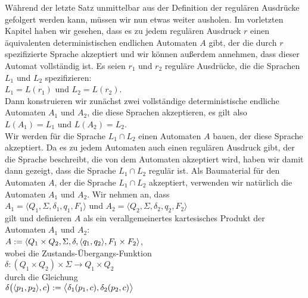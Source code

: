 \proof W\"ahrend der letzte Satz unmittelbar aus der Definition der regul\"aren Ausdr\"ucke
gefolgert werden kann, m\"ussen wir nun etwas weiter ausholen.  Im vorletzten Kapitel haben wir
gesehen, dass es zu jedem regul\"aren Ausdruck $r$ einen \"aquivalenten deterministischen
endlichen Automaten $A$ gibt, der die durch $r$ spezifizierte Sprache akzeptiert und wir
k\"onnen au{\ss}erdem annehmen, dass dieser Automat vollst\"andig ist.  Es seien $r_1$ und $r_2$
regul\"are Ausdr\"ucke, die die Sprachen $L_1$ und $L_2$ spezifizieren:
\\[0.2cm]
\hspace*{1.3cm}
$L_1 = L(r_1)$ \quad und \quad $L_2 = L(r_2)$.
\\[0.2cm]
Dann konstruieren wir zun\"achst zwei vollst\"andige deterministische endliche Automaten $A_1$
und $A_2$, die diese Sprachen akzeptieren, es gilt also
\\[0.2cm]
\hspace*{1.3cm}
$L(A_1) = L_1$ \quad und \quad $L(A_2) = L_2$.
\\[0.2cm]
Wir werden f\"ur die Sprache $L_1 \cap L_2$ einen Automaten $A$ bauen, der diese Sprache
akzeptiert.  Da es zu jedem Automaten auch einen regul\"aren Ausdruck gibt, 
der die Sprache beschreibt, die von dem Automaten akzeptiert wird, 
haben wir damit dann gezeigt, dass die Sprache $L_1 \cap L_2$ regul\"ar ist.
Als Baumaterial f\"ur den Automaten $A$, der die Sprache $L_1 \cap L_2$ akzeptiert, 
verwenden wir nat\"urlich die Automaten $A_1$ und $A_2$.  Wir nehmen an, dass
\\[0.2cm]
\hspace*{1.3cm}
$A_1 = \langle Q_1, \Sigma, \delta_1, q_1, F_1 \rangle$ \quad und \quad
$A_2 = \langle Q_2, \Sigma, \delta_2, q_2, F_2 \rangle$
\\[0.2cm]
gilt und definieren $A$ als ein verallgemeinertes kartesisches Produkt der Automaten $A_1$ und $A_2$:
\\[0.2cm]
\hspace*{1.3cm}
$A := \langle Q_1 \times Q_2, \Sigma, \delta, \pair(q_1,q_2), F_1 \times F_2 \rangle$,
\\[0.2cm]
wobei die Zustands-\"Ubergangs-Funktion 
\\[0.2cm]
\hspace*{1.3cm}
 $\delta : (Q_1 \times Q_2) \times \Sigma \rightarrow Q_1 \times Q_2$ 
\\[0.2cm]
durch die Gleichung
\\[0.2cm]
\hspace*{1.3cm}
$\delta\bigl( \pair(p_1, p_2), c \bigr) := \bigl\langle\delta_1(p_1,c), \delta_2(p_2,c)\bigr\rangle$
